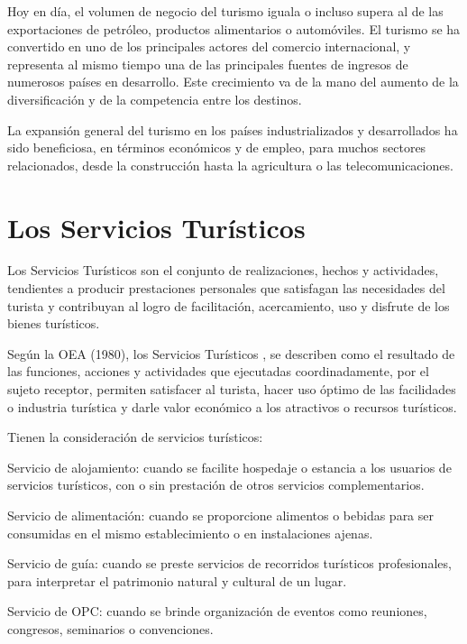 Hoy en día, el volumen de negocio del turismo iguala o incluso supera al de las exportaciones de petróleo, productos alimentarios o automóviles. El turismo se ha convertido en uno de los principales actores del comercio internacional, y representa al mismo tiempo una de las principales fuentes de ingresos de numerosos países en desarrollo. Este crecimiento va de la mano del aumento de la diversificación y de la competencia entre los destinos.

La expansión general del turismo en los países industrializados y desarrollados ha sido beneficiosa, en términos económicos y de empleo, para muchos sectores relacionados, desde la construcción hasta la agricultura o las telecomunicaciones.





\section{Los Servicios Turísticos}



Los Servicios Turísticos son el conjunto de  realizaciones, hechos y actividades, tendientes a producir prestaciones personales que satisfagan las necesidades del turista y contribuyan al logro de facilitación, acercamiento, uso y disfrute de los bienes turísticos.

Según la OEA (1980), los Servicios Turísticos , se describen como el resultado de las funciones, acciones y actividades que ejecutadas coordinadamente, por el sujeto receptor, permiten satisfacer al turista, hacer uso óptimo de las facilidades o industria turística y darle valor económico a los atractivos o recursos turísticos.

Tienen la consideración de servicios turísticos:


	
	 Servicio de alojamiento: cuando se facilite hospedaje o estancia a los usuarios de servicios turísticos, con o sin prestación de otros servicios complementarios.
	
	 Servicio de alimentación: cuando se proporcione alimentos o bebidas para ser consumidas en el mismo establecimiento o en instalaciones ajenas.
	
	 Servicio de guía: cuando se preste servicios de recorridos turísticos profesionales, para interpretar el patrimonio natural y cultural de un lugar.
	
	 Servicio de OPC: cuando se brinde organización de eventos como reuniones, congresos, seminarios o convenciones.
	
